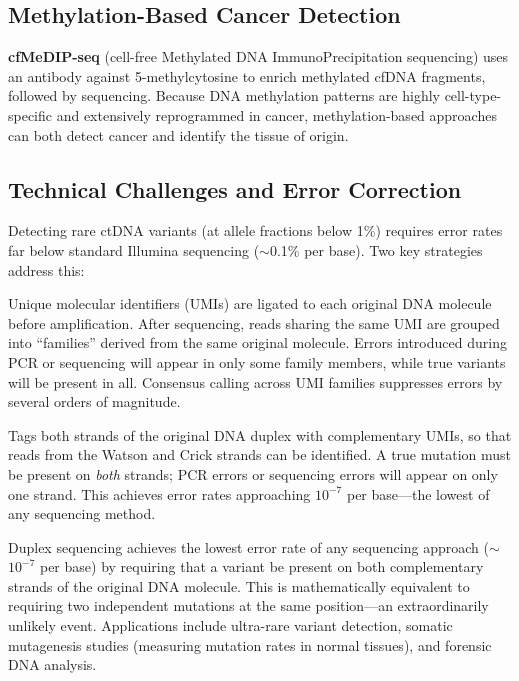 \subsection{Methylation-Based Cancer Detection}
\label{subsec:specialized:cfmedip}

\textbf{cfMeDIP-seq} (cell-free Methylated DNA ImmunoPrecipitation sequencing) uses an antibody against 5-methylcytosine to enrich methylated cfDNA fragments, followed by sequencing. Because DNA methylation patterns are highly cell-type-specific and extensively reprogrammed in cancer, methylation-based approaches can both detect cancer and identify the tissue of origin.

\subsection{Technical Challenges and Error Correction}
\label{subsec:specialized:error-correction}

Detecting rare ctDNA variants (at allele fractions below 1\%) requires error rates far below standard Illumina sequencing ($\sim$0.1\% per base). Two key strategies address this:

\begin{description}[style=nextline, itemsep=3pt]
  \item[\acrshort{UMI}-based error correction] Unique molecular identifiers (UMIs) are ligated to each original DNA molecule before amplification. After sequencing, reads sharing the same UMI are grouped into ``families'' derived from the same original molecule. Errors introduced during PCR or sequencing will appear in only some family members, while true variants will be present in all. Consensus calling across UMI families suppresses errors by several orders of magnitude.

  \item[Duplex sequencing] Tags both strands of the original DNA duplex with complementary UMIs, so that reads from the Watson and Crick strands can be identified. A true mutation must be present on \textit{both} strands; PCR errors or sequencing errors will appear on only one strand. This achieves error rates approaching $10^{-7}$ per base---the lowest of any sequencing method.
\end{description}

\begin{keyconcept}[title={Duplex Sequencing}]
Duplex sequencing achieves the lowest error rate of any sequencing approach ($\sim$$10^{-7}$ per base) by requiring that a variant be present on both complementary strands of the original DNA molecule. This is mathematically equivalent to requiring two independent mutations at the same position---an extraordinarily unlikely event. Applications include ultra-rare variant detection, somatic mutagenesis studies (measuring mutation rates in normal tissues), and forensic DNA analysis.
\end{keyconcept}



